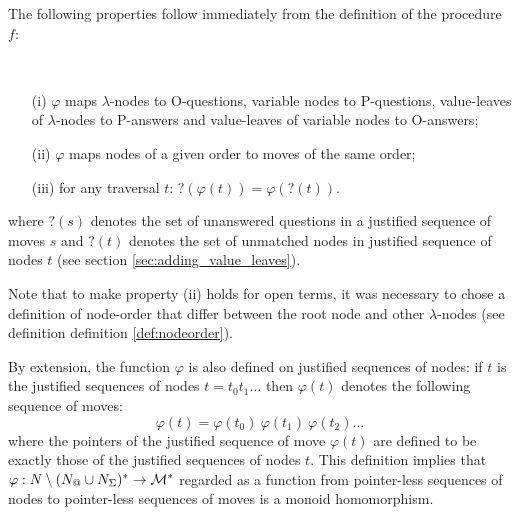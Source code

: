 The following properties follow immediately from the definition of the procedure $f$:
\begin{property} \
\label{proper:phi_conserve_order}
\begin{itemize}
\item[(i)] $\varphi$ maps $\lambda$-nodes to O-questions, variable nodes to
P-questions, value-leaves of $\lambda$-nodes to P-answers and
value-leaves of variable nodes to O-answers;
\item[(ii)] $\varphi$ maps nodes of a given order to moves of the same order;
\item[(iii)] for any traversal $t$: $?(\varphi(t)) = \varphi(?(t))$.
\end{itemize}
where $?(s)$ denotes the set of unanswered questions in a justified sequence of moves $s$ and $?(t)$ denotes the
set of unmatched nodes in justified sequence of nodes $t$ (see section \ref{sec:adding_value_leaves}).
\end{property}
Note that to make property (ii) holds for open terms, it was necessary to chose a definition of node-order that differ
between the root node and other $\lambda$-nodes (see definition definition \ref{def:nodeorder}).


By extension, the function $\varphi$ is also defined on justified
sequences of nodes: if $t$ is the justified sequences of nodes $t =
t_0 t_1 \ldots$ then $\varphi(t)$ denotes the following sequence of
moves:
$$\varphi(t) = \varphi(t_0)\ \varphi(t_1)\  \varphi(t_2) \ldots$$
where the pointers of the justified sequence of move $\varphi(t)$
are defined to be exactly those of the justified sequences of nodes
$t$.
This definition implies that $\varphi : N\setminus (N_@ \cup N_\Sigma)^* \rightarrow \mathcal{M}^*$ regarded as a function
from pointer-less sequences of nodes to pointer-less sequences of moves is a monoid homomorphism.

